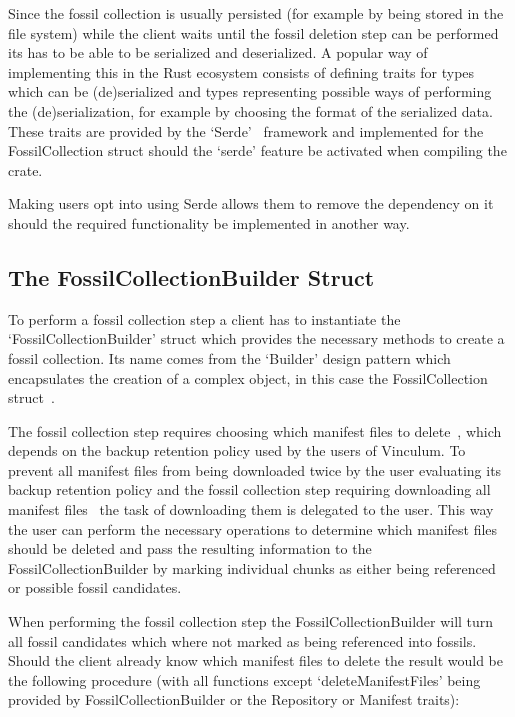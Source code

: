 Since the fossil collection is usually persisted (for example by being stored
in the file system) while the client waits until the fossil deletion step can be
performed its has to be able to be serialized and deserialized.
A popular way of implementing this in the Rust ecosystem consists of defining
traits for types which can be (de)serialized and types representing possible
ways of performing the (de)serialization, for example by choosing the format
of the serialized data.
These traits are provided by the `Serde'~\cite{Serde} framework and implemented
for the FossilCollection struct should the `serde' feature be activated when
compiling the crate.

Making users opt into using Serde allows them to remove the dependency on it
should the required functionality be implemented in another way.

\subsection{The FossilCollectionBuilder Struct}

To perform a fossil collection step a client has to instantiate the
`FossilCollectionBuilder' struct which provides the necessary methods to
create a fossil collection.
Its name comes from the `Builder' design pattern which encapsulates the creation
of a complex object, in this case the FossilCollection struct~\cite{GoF}.

The fossil collection step requires choosing which manifest files to
delete~\cite[Algorithm 1]{Duplicacy}, which depends on the backup retention
policy used by the users of Vinculum.
To prevent all manifest files from being downloaded twice by the user evaluating its backup
retention policy and the fossil collection step requiring downloading all manifest
files~\cite[Algorithm 1]{Duplicacy} the task of downloading them is delegated to the user.
This way the user can perform the necessary operations to determine which manifest files
should be deleted and pass the resulting information to the FossilCollectionBuilder by
marking individual chunks as either being referenced or possible fossil candidates.

When performing the fossil collection step the FossilCollectionBuilder will turn
all fossil candidates which where not marked as being referenced into fossils.
Should the client already know which manifest files to delete the result would be
the following procedure (with all functions except `deleteManifestFiles' being
provided by FossilCollectionBuilder or the Repository or Manifest traits):

